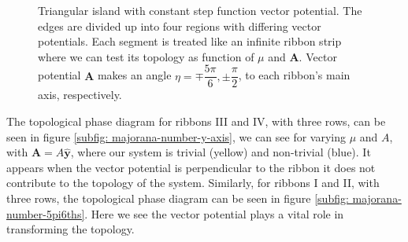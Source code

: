 \documentclass[aps,prb,showpacs,amsmath,amssymb,superscriptaddress]{revtex4-2}
\let\oldhat\hat
\renewcommand{\hat}[1]{\oldhat{\mathbf{#1}}}
\renewcommand{\vec}[1]{\mathbf{#1}}
\begin{document}
\begin{figure}[]
  \label{fig: triangular island vector potential divided}
  \caption{Triangular island with constant step function vector potential. The edges are divided up into four regions with differing vector potentials. Each segment is treated like an infinite ribbon strip where we can test its topology as function of $\mu$ and $\vec{A}$. Vector potential $\vec{A}$ makes an angle $\eta =  \mp \dfrac{5\pi}{6}, \pm \dfrac{\pi}{2}$, to each ribbon's main axis, respectively.}
\end{figure}

The topological phase diagram for ribbons III and IV, with three rows, can be seen in figure \ref{subfig: majorana-number-y-axis}, we can see for varying $\mu$ and $A$, with $\vec{A} = A\hat{y}$, where our system is trivial (yellow) and non-trivial (blue).
It appears when the vector potential is perpendicular to the ribbon it does not contribute to the topology of the system.
Similarly, for ribbons I and II, with three rows, the topological phase diagram can be seen in figure \ref{subfig: majorana-number-5pi6ths}.
Here we see the vector potential plays a vital role in transforming the topology.
\end{document}
